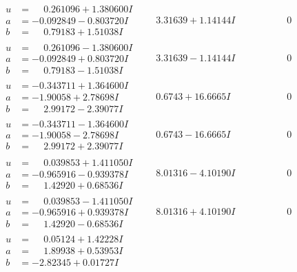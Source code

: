 \documentclass[1p]{elsarticle_modified}
\theoremstyle{definition}
\begin{document}
$$\begin{array}{c|c|c}
\begin{aligned}
u &= \phantom{-}0.261096 + 1.380600 I \\
a &= -0.092849 - 0.803720 I \\
b &= \phantom{-}0.79183 + 1.51038 I\end{aligned}
 & \phantom{-}3.31639 + 1.14144 I & \phantom{-0.000000 } 0 \\ \hline\begin{aligned}
u &= \phantom{-}0.261096 - 1.380600 I \\
a &= -0.092849 + 0.803720 I \\
b &= \phantom{-}0.79183 - 1.51038 I\end{aligned}
 & \phantom{-}3.31639 - 1.14144 I & \phantom{-0.000000 } 0 \\ \hline\begin{aligned}
u &= -0.343711 + 1.364600 I \\
a &= -1.90058 + 2.78698 I \\
b &= \phantom{-}2.99172 - 2.39077 I\end{aligned}
 & \phantom{-}0.6743 + 16.6665 I & \phantom{-0.000000 } 0 \\ \hline\begin{aligned}
u &= -0.343711 - 1.364600 I \\
a &= -1.90058 - 2.78698 I \\
b &= \phantom{-}2.99172 + 2.39077 I\end{aligned}
 & \phantom{-}0.6743 - 16.6665 I & \phantom{-0.000000 } 0 \\ \hline\begin{aligned}
u &= \phantom{-}0.039853 + 1.411050 I \\
a &= -0.965916 - 0.939378 I \\
b &= \phantom{-}1.42920 + 0.68536 I\end{aligned}
 & \phantom{-}8.01316 - 4.10190 I & \phantom{-0.000000 } 0 \\ \hline\begin{aligned}
u &= \phantom{-}0.039853 - 1.411050 I \\
a &= -0.965916 + 0.939378 I \\
b &= \phantom{-}1.42920 - 0.68536 I\end{aligned}
 & \phantom{-}8.01316 + 4.10190 I & \phantom{-0.000000 } 0 \\ \hline\begin{aligned}
u &= \phantom{-}0.05124 + 1.42228 I \\
a &= \phantom{-}1.89938 + 0.53953 I \\
b &= -2.82345 + 0.01727 I\end{aligned}

\end{array}$$
\end{document}
